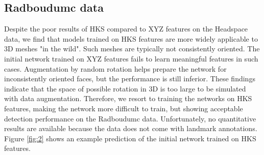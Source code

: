 \documentclass[class=article, crop=false]{standalone}
\begin{document}






\subsection{Radboudumc data}
Despite the poor results of HKS compared to XYZ features on the Headspace data, we find that models trained on HKS features are more widely applicable to 3D meshes "in the wild". Such meshes are typically not consistently oriented. The initial network trained on XYZ features fails to learn meaningful features in such cases. Augmentation by random rotation helps prepare the network for inconsistently oriented faces, but the performance is still inferior. These findings indicate that the space of possible rotation in 3D is too large to be simulated with data augmentation. Therefore, we resort to training the networks on HKS features, making the network more difficult to train, but showing acceptable detection performance on the Radboudumc data. Unfortunately, no quantitative results are available because the data does not come with landmark annotations. Figure \ref{fig:2} shows an example prediction of the initial network trained on HKS features. 
\end{document}
